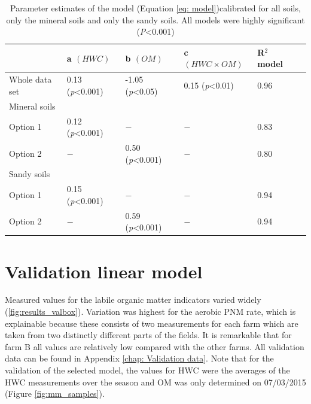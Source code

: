 \documentclass[10pt,twoside,dutch,english]{report}
\begin{document}
\begin{table}[h] %
	\caption{Parameter estimates of the model (Equation \ref{eq: model})calibrated for all soils, only the mineral soils and only the sandy soils. All models were highly significant (\textit{P}<0.001)}
	\footnotesize 
	\renewcommand{\arraystretch}{1.2}
	
	
	\begin{tabu} to %
		\toprule	\rowfont{\bfseries}
        & a \quad $(HWC)$	&b \quad $(OM)$ &c $(HWC\times OM)$  & R$^{2}$ model\\ \midrule
     Whole data set &0.13 (\textit{p}<0.001)&-1.05 (\textit{p}<0.05)&0.15 (\textit{p}<0.01)&0.96\\
     Mineral soils &&&&&\\
     \quad Option 1&0.12 (\textit{p}<0.001)&$-$&$-$&0.83\\
     \quad Option 2&$-$&0.50 (\textit{p}<0.001)&$-$&0.80\\
     Sandy soils&&&&\\
     \quad Option 1&0.15 (\textit{p}<0.001)&$-$&$-$&0.94\\
     \quad Option 2&$-$&0.59 (\textit{p}<0.001)&$-$&0.94\\
        \bottomrule
	\end{tabu}
		\label{tab:parameters}
\end{table}






\section{Validation linear model}
Measured values for the labile organic matter indicators varied widely (\ref{fig:results_valbox}). Variation was highest for the aerobic PNM rate, which is explainable because these consists of two measurements for each farm which are taken from two distinctly different parts of the fields. It is remarkable that for farm B all values are relatively low compared with the other farms. All validation data can be found in Appendix \ref{chap: Validation data}.
Note that for the validation of the selected model, the values for HWC were the averages of the HWC measurements over the season and OM was only determined on 07/03/2015 (Figure \ref{fig:mm_samples}).
\end{document}
